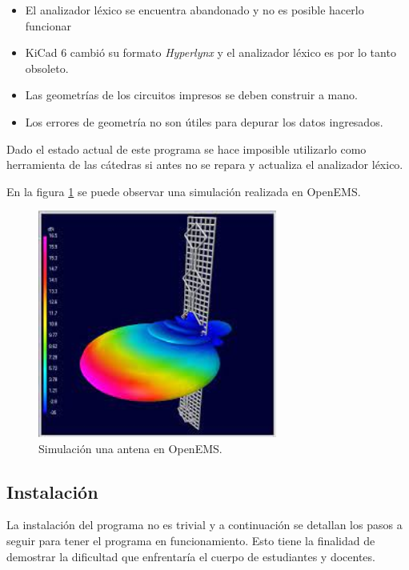 \documentclass[
    11pt,
    spanish,
    a4paper
]{article}
\begin{document}
\begin{itemize}
	\item El analizador léxico se encuentra abandonado y no es posible hacerlo funcionar
	\item KiCad 6 cambió su formato \emph{Hyperlynx} y el analizador léxico es por lo tanto obsoleto.
	\item Las geometrías de los circuitos impresos se deben construir a mano.
	\item Los errores de geometría no son útiles para depurar los datos ingresados.
\end{itemize}

Dado el estado actual de este programa se hace imposible utilizarlo como herramienta de las cátedras si antes no se repara y actualiza el analizador léxico.

En la figura \ref{fig:openems} se puede observar una simulación realizada en OpenEMS.

\begin{figure}[htbp]
	\centering
	\includegraphics[width=0.7\textwidth]{img/openems.jpeg}
	\caption{Simulación una antena en OpenEMS.}
	\label{fig:openems}
\end{figure}

\subsection{Instalación}
\label{sub:oinstalacion}

La instalación del programa no es trivial y a continuación se detallan los pasos a seguir para tener el programa en funcionamiento.
Esto tiene la finalidad de demostrar la dificultad que enfrentaría el cuerpo de estudiantes y docentes.
\end{document}
